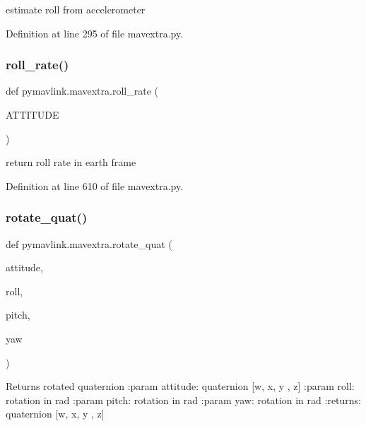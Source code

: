 \begin{DoxyVerb}estimate roll from accelerometer\end{DoxyVerb}
 

Definition at line 295 of file mavextra.\+py.

\mbox{\label{namespacepymavlink_1_1mavextra_ad1a6d8f7d2affd450da8c9a6a3d36e05}} 
\subsubsection{\texorpdfstring{roll\_rate()}{roll\_rate()}}
{\footnotesize\ttfamily def pymavlink.\+mavextra.\+roll\+\_\+rate (\begin{DoxyParamCaption}\item[{}]{A\+T\+T\+I\+T\+U\+DE }\end{DoxyParamCaption})}

\begin{DoxyVerb}return roll rate in earth frame\end{DoxyVerb}
 

Definition at line 610 of file mavextra.\+py.

\mbox{\label{namespacepymavlink_1_1mavextra_a44f4f12a741cc819b9197e09e78b4e78}} 
\subsubsection{\texorpdfstring{rotate\_quat()}{rotate\_quat()}}
{\footnotesize\ttfamily def pymavlink.\+mavextra.\+rotate\+\_\+quat (\begin{DoxyParamCaption}\item[{}]{attitude,  }\item[{}]{roll,  }\item[{}]{pitch,  }\item[{}]{yaw }\end{DoxyParamCaption})}

\begin{DoxyVerb}Returns rotated quaternion
:param attitude: quaternion [w, x, y , z]
:param roll: rotation in rad
:param pitch: rotation in rad
:param yaw: rotation in rad
:returns: quaternion [w, x, y , z]
\end{DoxyVerb}
 

